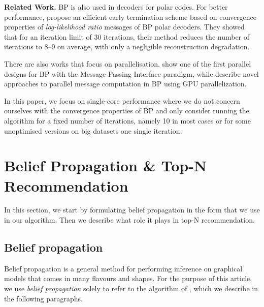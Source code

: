 \documentclass[letterpaper]{article}
\newcommand{\mypar}[1]{{\bf #1.}}
\begin{document}
\mypar{Related Work}
BP is also used in decoders for polar codes. For better performance, \citet{related1} propose an efficient early termination scheme based on convergence properties of \emph{log-likelihood ratio} messages of BP polar decoders. They showed that for an iteration limit of 30 iterations, their method reduces the number of iterations to 8--9 on average, with only a negligible reconstruction degradation.

There are also works that focus on parallelisation. \citet{related2} show one of the first parallel designs for BP with the Message Passing Interface paradigm, while \citet{related3} describe novel approaches to parallel message computation in BP using GPU parallelization.

In this paper, we focus on single-core performance where we do not concern ourselves with the convergence properties of BP and only consider running the algorithm for a fixed number of iterations, namely 10 in most cases or for some unoptimised versions on big datasets one single iteration. 

\section{Belief Propagation \& Top-N Recommendation}\label{sec:background}

In this section, we start by formulating belief propagation in the form that we
use in our algorithm. Then we describe what role it plays in top-N
recommendation.


\subsection{Belief propagation} \label{subsec:bp}

Belief propagation is a general method for performing inference on
graphical models that comes in many flavours and shapes. For the purpose of
this article, we use \emph{belief propagation} solely to refer to the algorithm
of \citet[Section 2.1]{top-n-recommendation}, which we describe in the
following paragraphs.
\end{document}
